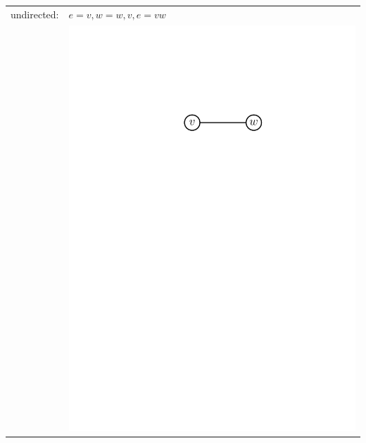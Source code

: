 \begin{tabular}{l l}
undirected:& $ e = {v,w} = {w,v}, e = vw$\\
	& \includegraphics[scale=.5]{01_graph_theory/pics/graph_edge.pdf} \\


\end{tabular}
